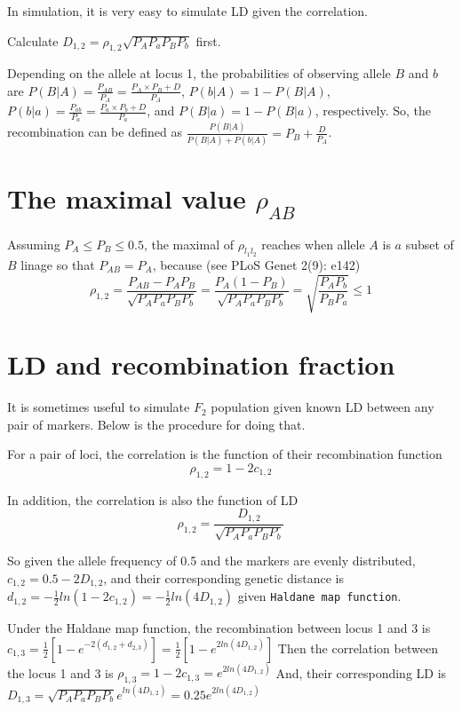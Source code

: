 \documentclass[]{book}
\begin{document}
In simulation, it is very easy to simulate LD given the correlation.

Calculate \(D_{1,2}=\rho_{1,2}\sqrt{P_AP_aP_BP_b}\) first.

Depending on the allele at locus 1, the probabilities of observing
allele \(B\) and \(b\) are
\(P(B|A)=\frac{P_{AB}}{P_{A}} =\frac{P_A\times P_B+D}{P_A}\),
\(P(b|A)=1-P(B|A)\),
\(P(b|a)=\frac{P_{ab}}{P_a} =\frac{P_a\times P_b+D}{P_a}\), and
\(P(B|a)=1-P(B|a)\), respectively. So, the recombination can be defined
as \(\frac{P(B|A)}{P(B|A) + P(b|A)}=P_B + \frac{D}{P_A}\).

\hypertarget{the-maximal-value-rho_ab}{%
\section{\texorpdfstring{The maximal value
\(\rho_{AB}\)}{The maximal value \textbackslash{}rho\_\{AB\}}}\label{the-maximal-value-rho_ab}}

Assuming \(P_A \leq P_B \leq 0.5\), the maximal of \(\rho_{l_1l_2}\)
reaches when allele \(A\) is \(a\) subset of \(B\) linage so that
\(P_{AB}=P_{A}\), because (see PLoS Genet 2(9): e142)
\[\rho_{1,2}=\frac{P_{AB}-P_{A}P_{B}}{\sqrt{P_A P_a P_B P_b}}=\frac{P_A(1-P_B)}{\sqrt{P_A P_a P_B P_b}}=\sqrt{\frac{P_AP_b}{P_B P_a}} \leq 1\]

\hypertarget{ld-and-recombination-fraction}{%
\section{LD and recombination
fraction}\label{ld-and-recombination-fraction}}

It is sometimes useful to simulate \(F_2\) population given known LD
between any pair of markers. Below is the procedure for doing that.

For a pair of loci, the correlation is the function of their
recombination function \[\rho_{1,2}=1-2c_{1,2}\]

In addition, the correlation is also the function of LD
\[\rho_{1,2}=\frac{D_{1,2}}{\sqrt{P_AP_aP_BP_b}}\]

So given the allele frequency of 0.5 and the markers are evenly
distributed, \(c_{1,2}=0.5-2D_{1,2}\), and their corresponding genetic
distance is
\(d_{1,2}=-\frac{1}{2}ln(1-2c_{1,2})=-\frac{1}{2}ln(4D_{1,2})\) given
\texttt{Haldane\ map\ function}.

Under the Haldane map function, the recombination between locus 1 and 3
is
\(c_{1,3}=\frac{1}{2}[1-e^{-2(d_{1,2}+d_{2,3})}]=\frac{1}{2}[1-e^{2ln(4D_{1,2})}]\)
Then the correlation between the locus 1 and 3 is
\(\rho_{1,3}=1-2c_{1,3}=e^{2ln(4D_{1,2})}\) And, their corresponding LD
is \(D_{1,3}=\sqrt{P_AP_aP_BP_b}e^{ln(4D_{1,2})}=0.25e^{2ln(4D_{1,2})}\)
\end{document}
